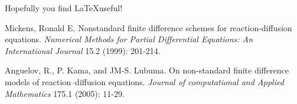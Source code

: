 \documentclass[a4paper]{article}
\begin{document}
Hopefully you find \LaTeX useful!

\begin{thebibliography}{9}
    
    Mickens, Ronald E. Nonstandard finite difference schemes for reaction‐diffusion equations. \emph{Numerical Methods for Partial Differential Equations: An International Journal} 15.2 (1999): 201-214.

    Anguelov, R., P. Kama, and JM-S. Lubuma. On non-standard finite difference models of reaction–diffusion equations. \emph{Journal of computational and Applied Mathematics} 175.1 (2005): 11-29.

\end{thebibliography}
\end{document}
